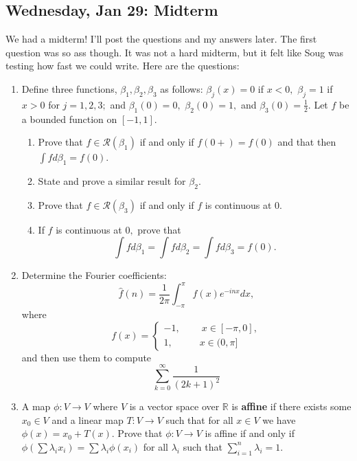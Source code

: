 \documentclass[10pt, oneside]{article}
\newcommand{\bbR}{\mathbb{R}}
\theoremstyle{definition}
\begin{document}
\newpage
\subsection{Wednesday, Jan 29: Midterm}
We had a midterm! I'll post the questions and my answers later. The first question was so ass though. It was not a hard midterm, but it felt like Soug was testing how fast we could write. Here are the questions:

\begin{enumerate}
    \item \begin{problem}
    Define three functions, $\beta_1, \beta_2, \beta_3$ as follows: $\beta_j(x) = 0$ if $x<0,$ $\beta_j = 1$ if $x>0$ for $j = 1,2,3;$ and $\beta_1(0) = 0,$ $\beta_2(0) = 1,$ and $\beta_3(0) = \frac{1}{2}.$ Let $f$ be a bounded function on $[-1,1].$ 
\end{problem}
\begin{enumerate}
    \item 
    \begin{problem}
        Prove that $f\in \mathcal{R}(\beta_1)$ if and only if $f(0 + ) = f(0)$ and that then $\int f d\beta_1 = f(0).$
    \end{problem}
    \item 
    \begin{problem}
        State and prove a similar result for $\beta_2.$
    \end{problem}
    \item 
    \begin{problem}
            Prove that $f\in \mathcal{R}(\beta_3)$ if and only if $f$ is continuous at $0.$
    \end{problem}
    \item 
    \begin{problem}
        If $f$ is continuous at $0,$ prove that 
        \[\int f d\beta_1 = \int f d\beta_2 = \int f d\beta_3 = f(0).\] 
    \end{problem}
\end{enumerate}
\item Determine the Fourier coefficients:
\[\hat{f}(n) = \frac{1}{2\pi}\int_{-\pi}^\pi f(x)e^{-inx}dx,\] where 
\[f(x) = \begin{cases}
    -1, \qquad \: x\in [-\pi, 0],\\
    1, \qquad \;\;\:x\in(0,\pi]
\end{cases}\]
and then use them to compute
\[\sum_{k=0}^\infty \frac{1}{(2k + 1)^2}\]
\item A map $\phi: V \to V$ where $V$ is a vector space over $\bbR$ is \textbf{affine} if there exists some $x_0 \in V$ and a linear map $T: V \to V$ such that for all $x\in V$ we have $\phi(x) = x_0 + T(x).$ Prove that $\phi: V\to V$ is affine if and only if $\phi(\sum \lambda_i x_i) = \sum \lambda_i \phi(x_i)$ for all $\lambda_i$ such that $\sum_{i=1}^n \lambda_i = 1.$

\end{enumerate}
\end{document}
